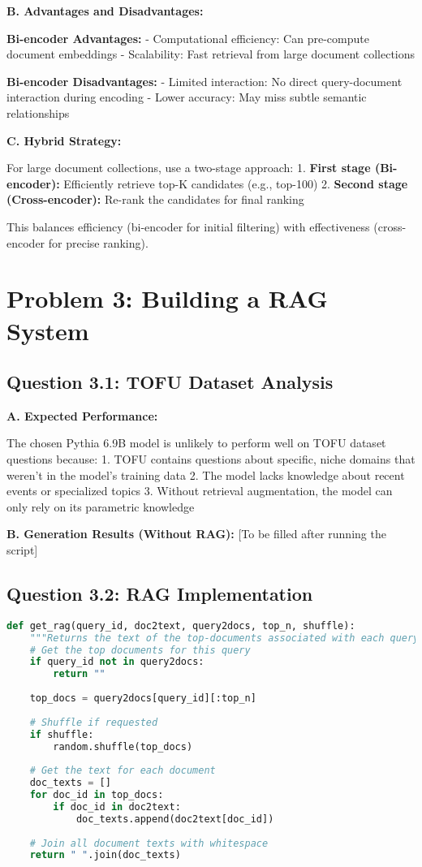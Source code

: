 \documentclass[11pt]{article}
\begin{document}
\textbf{B. Advantages and Disadvantages:}

\textbf{Bi-encoder Advantages:}
- Computational efficiency: Can pre-compute document embeddings
- Scalability: Fast retrieval from large document collections

\textbf{Bi-encoder Disadvantages:}
- Limited interaction: No direct query-document interaction during encoding
- Lower accuracy: May miss subtle semantic relationships

\textbf{C. Hybrid Strategy:}

For large document collections, use a two-stage approach:
1. \textbf{First stage (Bi-encoder):} Efficiently retrieve top-K candidates (e.g., top-100)
2. \textbf{Second stage (Cross-encoder):} Re-rank the candidates for final ranking

This balances efficiency (bi-encoder for initial filtering) with effectiveness (cross-encoder for precise ranking).

\section{Problem 3: Building a RAG System}

\subsection{Question 3.1: TOFU Dataset Analysis}

\textbf{A. Expected Performance:}

The chosen Pythia 6.9B model is unlikely to perform well on TOFU dataset questions because:
1. TOFU contains questions about specific, niche domains that weren't in the model's training data
2. The model lacks knowledge about recent events or specialized topics
3. Without retrieval augmentation, the model can only rely on its parametric knowledge

\textbf{B. Generation Results (Without RAG):} [To be filled after running the script]

\subsection{Question 3.2: RAG Implementation}

\begin{lstlisting}[language=Python]
def get_rag(query_id, doc2text, query2docs, top_n, shuffle):
    """Returns the text of the top-documents associated with each query."""
    # Get the top documents for this query
    if query_id not in query2docs:
        return ""
    
    top_docs = query2docs[query_id][:top_n]
    
    # Shuffle if requested
    if shuffle:
        random.shuffle(top_docs)
    
    # Get the text for each document
    doc_texts = []
    for doc_id in top_docs:
        if doc_id in doc2text:
            doc_texts.append(doc2text[doc_id])
    
    # Join all document texts with whitespace
    return " ".join(doc_texts)
\end{lstlisting}
\end{document}
